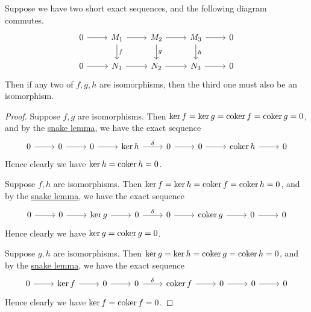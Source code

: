 \begin{corollary}
    Suppose we have two short exact sequences,
    and the following diagram commutes.
    \begin{equation*}
        \begin{tikzcd}
            0 \arrow{r} & M_1 \arrow{d}{f} \arrow{r} &
            M_2 \arrow{d}{g} \arrow{r} & M_3 \arrow{d}{h} \arrow{r} & 0 \\
            0 \arrow{r} & N_1 \arrow{r} & N_2 \arrow{r} & N_3 \arrow{r} & 0
        \end{tikzcd}
    \end{equation*}
    Then if any two of \(f,g,h\) are isomorphisms,
    then the third one must also be an isomorphism.
\end{corollary}
\begin{proof}
    Suppose \(f,g\) are isomorphisms.
    Then \(\ker f = \ker g = \operatorname{coker} f = \operatorname{coker} g = 0\),
    and by the \hyperref[lem:snake]{snake lemma}, we have the exact sequence
    \begin{equation*}
        \begin{tikzcd}
            0 \arrow{r} & 0 \arrow{r} & 0 \arrow{r} & \ker h \arrow{r}{\delta} &
            0 \arrow{r} & 0 \arrow{r} & \coker h \arrow{r} & 0
        \end{tikzcd}
    \end{equation*}
    Hence clearly we have \(\ker h = \operatorname{coker} h = 0\).
    
    Suppose \(f,h\) are isomorphisms.
    Then \(\ker f = \ker h = \operatorname{coker} f = \operatorname{coker} h = 0\),
    and by the \hyperref[lem:snake]{snake lemma}, we have the exact sequence
    \begin{equation*}
        \begin{tikzcd}
            0 \arrow{r} & 0 \arrow{r} & \ker g \arrow{r} & 0 \arrow{r}{\delta} &
            0 \arrow{r} & \coker g \arrow{r} & 0 \arrow{r} & 0
        \end{tikzcd}
    \end{equation*}
    Hence clearly we have \(\ker g = \operatorname{coker} g = 0\).
    
    Suppose \(g,h\) are isomorphisms.
    Then \(\ker g = \ker h = \operatorname{coker} g = \operatorname{coker} h = 0\),
    and by the \hyperref[lem:snake]{snake lemma}, we have the exact sequence
    \begin{equation*}
        \begin{tikzcd}
            0 \arrow{r} & \ker f \arrow{r} & 0 \arrow{r} & 0 \arrow{r}{\delta} &
            \coker f \arrow{r} & 0 \arrow{r} & 0 \arrow{r} & 0
        \end{tikzcd}
    \end{equation*}
    Hence clearly we have \(\ker f = \operatorname{coker} f = 0\).
\end{proof}

